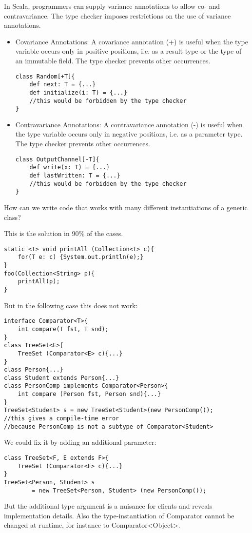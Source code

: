 \begin{mytitle} In Scala, programmers can supply variance annotations to allow co- and contravariance. The type checker imposes restrictions on the use of variance annotations.
\begin{itemize}
    \item Covariance Annotations: A covariance annotation (+) is useful when the type variable occurs only in positive positions, i.e. as a result type or the type of an immutable field. The type checker prevents other occurrences. 
    \lstset{language=Scala}
    \begin{lstlisting}
class Random[+T]{
    def next: T = {...}
    def initialize(i: T) = {...} 
    //this would be forbidden by the type checker
}
    \end{lstlisting}
    \item Contravariance Annotations: A contravariance annotation (-) is useful when the type variable occurs only in negative positions, i.e. as a parameter type. The type checker prevents other occurrences.
     \lstset{language=Scala}
    \begin{lstlisting}
class OutputChannel[-T]{
    def write(x: T) = {...}
    def lastWritten: T = {...} 
    //this would be forbidden by the type checker
}
    \end{lstlisting}
\end{itemize}
\end{mytitle}
\begin{mytitle} How can we write code that works with many different instantiations of a generic class?
\end{mytitle}
\begin{mytitle} This is the solution in 90\% of the cases. 
    \lstset{language = Java}
    \begin{lstlisting}
static <T> void printAll (Collection<T> c){
    for(T e: c) {System.out.println(e);}
}
foo(Collection<String> p){
    printAll(p);
}
    \end{lstlisting}
    But in the following case this does not work: 
    \begin{lstlisting}
interface Comparator<T>{
    int compare(T fst, T snd);
}
class TreeSet<E>{
    TreeSet (Comparator<E> c){...}
}
class Person{...}
class Student extends Person{...}
class PersonComp implements Comparator<Person>{
    int compare (Person fst, Person snd){...}
}
TreeSet<Student> s = new TreeSet<Student>(new PersonComp());
//this gives a compile-time error
//because PersonComp is not a subtype of Comparator<Student>
    \end{lstlisting}
    We could fix it by adding an additional parameter: 
    \begin{lstlisting}
class TreeSet<F, E extends F>{
    TreeSet (Comparator<F> c){...}
}
TreeSet<Person, Student> s
        = new TreeSet<Person, Student> (new PersonComp());
    \end{lstlisting}
    But the additional type argument is a nuisance for clients and reveals implementation details. Also the type-instantiation of Comparator cannot be changed at runtime, for instance to Comparator<Object>.
\end{mytitle}
